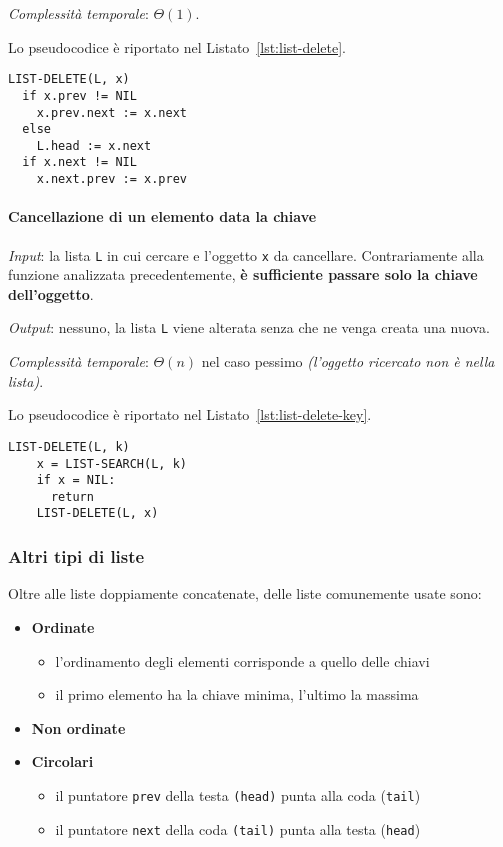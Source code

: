 \documentclass[italian, 10pt]{article}
\begin{document}
\textit{Complessità temporale}: \(\Theta(1)\).

\bigskip
Lo pseudocodice è riportato nel Listato~\ref{lst:list-delete}.

\begin{lstlisting}[style=pseudocode, caption={Pseudocodice dell'algoritmo \texttt{LIST-DELETE}}, label={lst:list-delete}]
LIST-DELETE(L, x)
  if x.prev != NIL
    x.prev.next := x.next
  else
    L.head := x.next
  if x.next != NIL
    x.next.prev := x.prev
\end{lstlisting}

\paragraph{Cancellazione di un elemento data la chiave}

\textit{Input}: la lista \texttt{L} in cui cercare e l'oggetto \texttt{x} da cancellare.
Contrariamente alla funzione analizzata precedentemente, \textbf{è sufficiente passare solo la chiave dell'oggetto}.

\textit{Output}: nessuno, la lista \texttt{L} viene alterata senza che ne venga creata una nuova.

\textit{Complessità temporale}: \(\Theta(n)\) nel caso pessimo \textit{(l'oggetto ricercato non è nella lista)}.

\bigskip
Lo pseudocodice è riportato nel Listato~\ref{lst:list-delete-key}.

\begin{lstlisting}[style=pseudocode, caption={Pseudocodice dell'algoritmo \texttt{LIST-DELETE-KEY}}, label={lst:list-delete-key}]
  LIST-DELETE(L, k)
    x = LIST-SEARCH(L, k)
    if x = NIL:
      return
    LIST-DELETE(L, x)
\end{lstlisting}

\subsubsection{Altri tipi di liste}

Oltre alle liste doppiamente concatenate, delle liste comunemente usate sono:

\begin{itemize}
  \item \textbf{Ordinate}
        \begin{itemize}
          \item l'ordinamento degli elementi corrisponde a quello delle chiavi
          \item il primo elemento ha la chiave minima, l'ultimo la massima
        \end{itemize}
  \item \textbf{Non ordinate}
  \item \textbf{Circolari}
        \begin{itemize}
          \item il puntatore \texttt{prev} della testa \texttt{(\texttt{head})} punta alla coda (\texttt{tail})
          \item il puntatore \texttt{next} della coda \texttt{(\texttt{tail})} punta alla testa (\texttt{head})
        \end{itemize}
\end{itemize}
\end{document}
